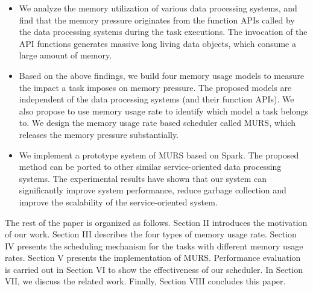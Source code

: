 \begin{itemize}

\item We analyze the memory utilization of various data processing systems, and find that the memory pressure originates from the function APIs called by the data processing systems during the task executions. The invocation of the API functions generates massive long living data objects, which consume a large amount of memory. 


\item Based on the above findings, we build four memory usage models to measure the impact a task imposes on memory pressure. The proposed models are independent of the data processing systems (and their function APIs). We also propose to use memory usage rate to identify which model a task belongs to. We design the memory usage rate based scheduler called MURS, which releases the memory pressure substantially.


\item We implement a prototype system of MURS based on Spark. The proposed method can be ported to other similar service-oriented data processing systems. The experimental results have shown that our system can significantly improve system performance, reduce garbage collection and improve the scalability of the service-oriented system.

\end{itemize}

The rest of the paper is organized as follows. Section II introduces the motivation of our work. Section III describes the four types of memory usage rate. Section IV presents the scheduling mechanism for the tasks with different memory usage rates. Section V presents the implementation of MURS. Performance evaluation is carried out in Section VI to show the effectiveness of our scheduler. In Section VII, we discuss the related work. Finally, Section VIII concludes this paper.
